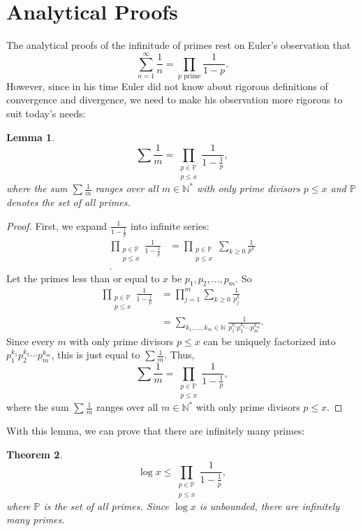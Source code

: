 \documentclass[a4paper]{article}
\newtheorem{theorem}{Theorem}[section]
\newtheorem{lemma}[theorem]{Lemma}
\theoremstyle{definition}
\theoremstyle{remark}
\begin{document}
\section{Analytical Proofs}
The analytical proofs of the infinitude of primes rest on Euler's observation that 
\[
\sum^\infty_{n=1}\frac{1}{n}=\prod_{p\text{ prime}}\frac{1}{1-p}
.
\]
However, since in his time Euler did not know about rigorous definitions of convergence and divergence, we need to make his observation more rigorous to suit today's needs:
\begin{lemma}
  \[
  \sum\frac{1}{m}=\prod\limits_{\substack{p\in\mathbb{P}\\p\le x}}\frac{1}{1-\frac{1}{p}}
  ,
  \]
  where the sum $\sum\frac{1}{m}$ ranges over all $m\in\mathbb{N^*}$ with only prime divisors $p\le x$ and $\mathbb{P}$ denotes the set of all primes.
  \label{lem:EulerProduct}
\end{lemma}
\begin{proof}
  First, we expand $\frac{1}{1-\frac{1}{p}}$ into infinite series:
  \begin{align*}
    \prod\limits_{\substack{p\in\mathbb{P}\\p\le x}}\frac{1}{1-\frac{1}{p}}&=\prod\limits_{\substack{p\in\mathbb{P}\\p\le x}}\sum_{k\ge0}\frac{1}{p^k}\\
    .
  \end{align*}
  Let the primes less than or equal to $x$ be $p_1,p_2,\dots,p_m$. So
  \begin{align*}
    \prod\limits_{\substack{p\in\mathbb{P}\\p\le x}}\frac{1}{1-\frac{1}{p}}&=\prod\limits_{j=1}^m\sum_{k\ge0}\frac{1}{p_j^k}\\
    &=\sum\limits_{k_1,\dots,k_m\in\mathbb{N}}\frac{1}{p_1^{k_1}p_2^{k_2}\cdots p_m^{k_m}}
    .
  \end{align*}
  Since every $m$ with only prime divisors $p\le x$ can be uniquely factorized into $p_1^{k_1}p_2^{k_2}\cdots p_m^{k_m}$, this is just equal to $\sum\frac{1}{m}$. Thus,
  \[
  \sum\frac{1}{m}=\prod\limits_{\substack{p\in\mathbb{P}\\p\le x}}\frac{1}{1-\frac{1}{p}}
  ,
  \]
  where the sum $\sum\frac{1}{m}$ ranges over all $m\in\mathbb{N^*}$ with only prime divisors $p\le x$.
\end{proof}
With this lemma, we can prove that there are infinitely many primes:
\begin{theorem}
  \[
  \log x\le \prod\limits_{\substack{p\in\mathbb{P}\\p\le x}}\frac{1}{1-\frac{1}{p}}
  ,
  \]
  where $\mathbb{P}$ is the set of all primes. Since $\log x$ is unbounded, there are infinitely many primes.
  \label{thm:EulerInfinitePrimes}
\end{theorem}
\end{document}
